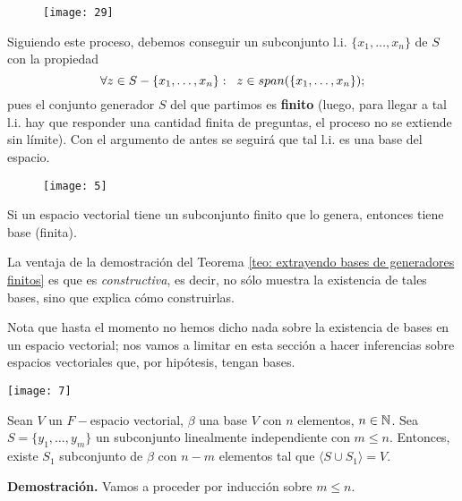 \begin{figure}[H]
	\centering
	\texttt{[image: 29]} 
\end{figure}	

Siguiendo este proceso, debemos conseguir un subconjunto l.i.
$\{x_{1}, \ldots , x_{n}\}$ de $S$ con la propiedad 
\[
\forall z \in S - \{x_{1}, \ldots , x_{n}\} : \hspace{0.2cm}
z \in span(\{x_{1}, \ldots , x_{n}\});
\]
pues el conjunto generador $S$ del que partimos es \textbf{finito}
(luego, para llegar a tal l.i. hay que responder una cantidad finita de preguntas,
el proceso no se extiende sin límite).
Con el argumento de antes se seguirá que tal l.i. es una base del espacio.

\begin{figure}[H]
	\centering
	\texttt{[image: 5]} 
\end{figure}	
\QEDB
\vspace{0.2cm}

\begin{cor}
Si un espacio vectorial tiene un subconjunto finito que lo genera,
entonces tiene base (finita).
\end{cor}

La ventaja de la demostración del Teorema
\ref{teo: extrayendo bases de generadores finitos}
es que es \textit{constructiva}, es decir, no sólo
muestra la existencia de tales bases, sino que explica
cómo construirlas.

Nota que hasta el momento no hemos dicho nada sobre la existencia
de bases en un espacio vectorial; nos vamos a limitar en esta
sección a hacer inferencias sobre espacios vectoriales que,
por hipótesis, tengan bases. 

\begin{teo}
	\label{teo: un li se completa a generador mediante una base}
\begin{marginfigure}
\texttt{[image: 7]} 
\end{marginfigure}
Sean $V$ un $F-$espacio vectorial, $\beta$ una base $V$ con $n$
elementos, $n \in \mathbb{N}$. Sea
$S = \{ y_{1}, \ldots , y_{m} \}$ un subconjunto linealmente independiente
con $m \leq n$. Entonces, existe $S_{1}$ subconjunto de $\beta$
con $n-m$ elementos tal que $\langle S \cup S_{1} \rangle = V$.
\end{teo}
\noindent
\textbf{Demostración.}
Vamos a proceder por inducción sobre $m \leq n$.

